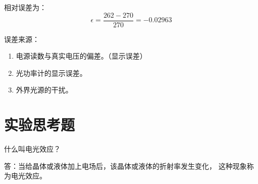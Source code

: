 \documentclass[UTF8]{ctexart}
\begin{document}
相对误差为：
$$\epsilon = \frac{262-270}{270}=-0.02963$$

误差来源：
\begin{enumerate}
	\item 电源读数与真实电压的偏差。（显示误差）
	\item 光功率计的显示误差。
	\item 外界光源的干扰。
\end{enumerate}
\section{实验思考题}

什么叫电光效应？

答：当给晶体或液体加上电场后，该晶体或液体的折射率发生变化，
这种现象称为电光效应。
\newpage
{}
\addappheadtotoc​

\appendix
%
\end{document}
